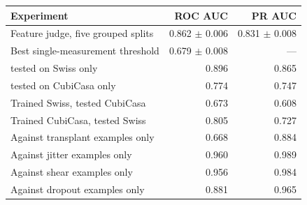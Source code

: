 \begin{tabular}{lrr}
\toprule
Experiment & ROC AUC & PR AUC \\
\midrule
Feature judge, five grouped splits & 0.862 $\pm$ 0.006 & 0.831 $\pm$ 0.008 \\
Best single-measurement threshold & 0.679 $\pm$ 0.008 & --- \\
\midrule
\quad tested on Swiss only & 0.896 & 0.865 \\
\quad tested on CubiCasa only & 0.774 & 0.747 \\
\midrule
Trained Swiss, tested CubiCasa & 0.673 & 0.608 \\
Trained CubiCasa, tested Swiss & 0.805 & 0.727 \\
\midrule
Against transplant examples only & 0.668 & 0.884 \\
Against jitter examples only & 0.960 & 0.989 \\
Against shear examples only & 0.956 & 0.984 \\
Against dropout examples only & 0.881 & 0.965 \\
\bottomrule
\end{tabular}